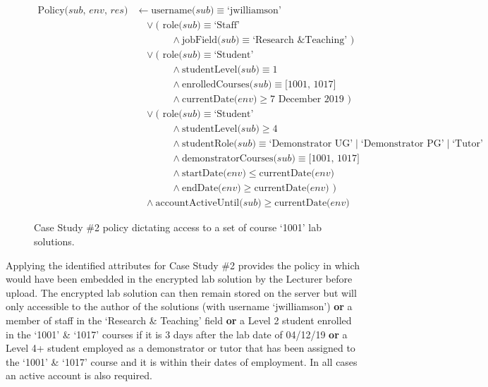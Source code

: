 \begin{figure}[ht]
  \centering
\begin{align*}
  \text{Policy($sub$, $env$, $res$)}
  &
    \leftarrow
    \text{username($sub$)} \equiv \text{`jwilliamson'}
  \\
  &
    \phantom{::}\vee
    \text{( role($sub$)} \equiv \text{`Staff'}
  \\
  &
    \phantom{::::::::}\wedge
    \text{jobField($sub$)} \equiv \text{`Research \& Teaching' )}
  \\
  &
    \phantom{::}\vee
    \text{( role($sub$)} \equiv \text{`Student'}
  \\
  &
    \phantom{::::::::}\wedge
    \text{studentLevel($sub$)} \equiv \text{1}
  \\
  &
    \phantom{::::::::}\wedge
    \text{enrolledCourses($sub$)} \equiv \text{[1001, 1017]}
  \\
  &
    \phantom{::::::::}\wedge
    \text{currentDate($env$)} \geq \text{7 December 2019 )}
  \\
  &
    \phantom{::}\vee
    \text{( role($sub$)} \equiv \text{`Student'}
  \\
  &
    \phantom{::::::::}\wedge
    \text{studentLevel($sub$)} \geq \text{4}
  \\
  &
    \phantom{::::::::}\wedge
    \text{studentRole($sub$)} \equiv \text{`Demonstrator UG'} \mid \text{`Demonstrator PG'} \mid \text{`Tutor'}
  \\
  &
    \phantom{::::::::}\wedge
    \text{demonstratorCourses($sub$)} \equiv \text{[1001, 1017]}
  \\
  &
    \phantom{::::::::}\wedge
    \text{startDate($env$)} \leq \text{currentDate($env$)}
  \\
  &
    \phantom{::::::::}\wedge
    \text{endDate($env$)} \geq \text{currentDate($env$) )}
  \\
  &
    \phantom{::}\wedge
    \text{accountActiveUntil($sub$)} \geq \text{currentDate($env$)}
\end{align*}
  \caption{
    \label{fig:case_study_policy_2}
    Case Study \#2 policy dictating access to a set of course `1001' lab solutions.
  }
\end{figure}
Applying the identified attributes for Case Study \#2 provides the policy in  which would have been embedded in the encrypted lab solution by the Lecturer before upload. The encrypted lab solution can then remain stored on the server but will only accessible to the author of the solutions (with username `jwilliamson') \textbf{or} a member of staff in the `Research \& Teaching' field \textbf{or} a Level 2 student enrolled in the `1001' \& `1017' courses if it is 3 days after the lab date of 04/12/19 \textbf{or} a Level 4+ student employed as a demonstrator or tutor that has been assigned to the `1001' \& `1017' course and it is within their dates of employment. In all cases an active account is also required.

